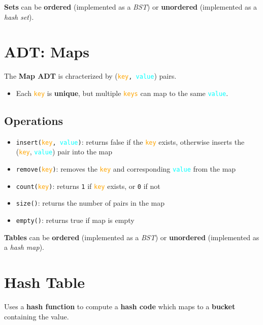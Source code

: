\documentclass[12pt, letterpaper]{article}
\begin{document}
\textbf{Sets} can be \textbf{ordered} (implemented as a \textit{BST}) or \textbf{unordered} (implemented as a \textit{hash set}).

\section*{ADT: Maps}

The \textbf{Map ADT} is chracterized by (\texttt{\textcolor{orange}{key}, \textcolor{cyan}{value}}) pairs.

\begin{itemize}
    \item Each \texttt{\textcolor{orange}{key}} is \textbf{unique}, but multiple \texttt{\textcolor{orange}{keys}} can map to the same \texttt{\textcolor{cyan}{value}}.
\end{itemize}

\subsection*{Operations}

\begin{itemize}
    \item \texttt{insert(\textcolor{orange}{key}, \textcolor{cyan}{value})}: returns false if the \texttt{\textcolor{orange}{key}} exists, otherwise inserts the (\texttt{\textcolor{orange}{key}}, \texttt{\textcolor{cyan}{value}}) pair into the map
    \item \texttt{remove(\textcolor{orange}{key})}: removes the \texttt{\textcolor{orange}{key}} and corresponding \texttt{\textcolor{cyan}{value}} from the map
    \item \texttt{count(\textcolor{orange}{key})}: returns \texttt{1} if \texttt{\textcolor{orange}{key}} exists, or \texttt{0} if not
    \item \texttt{size()}: returns the number of pairs in the map
    \item \texttt{empty()}: returns true if map is empty
\end{itemize}

\textbf{Tables} can be \textbf{ordered} (implemented as a \textit{BST}) or \textbf{unordered} (implemented as a \textit{hash map}).

\section*{Hash Table}

Uses a \textbf{hash function} to compute a \textbf{hash code} which maps to a \textbf{bucket} containing the value.
\end{document}
